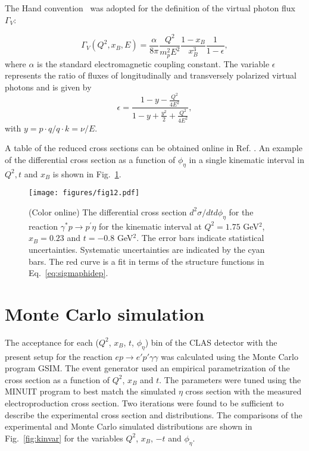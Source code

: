 \documentclass[prc,aps,floatfix,showpacs,showkeys,twocolumn,superscriptaddress,letterpaper,10pt]{revtex4-1}
\begin{document}
\noindent
The Hand convention~\cite{Hand:1963bb} was adopted for the
definition of the virtual photon flux $\Gamma_V$: 

\begin{equation}
\Gamma_V (Q^2,x_B,E)= \frac{\alpha}{8\pi} \frac{Q^2}{m_p^2 E^2} 
\frac{1-x_B}{x_B^3} \frac{1}{1-\epsilon},
\label{eq:GammaV}
\end{equation}
\noindent where $\alpha$ is the standard electromagnetic coupling constant.
The variable $\epsilon$ represents the ratio of fluxes of longitudinally  and transversely polarized virtual photons and is given by
\begin{equation}
\epsilon=\frac {1-y-\frac{Q^2}{4E^2}}   {1-y+\frac{y^2}{2}+\frac{Q^2}{4E^2} }
\label{epsilon},
\end{equation}
with $y=p \cdot q/q \cdot k=\nu/E$.

A table of  the  reduced cross sections  can be obtained online in Ref. \cite{Supplemental_eta-PRC}.
An example of the differential cross section as a function of 
$\phi_\eta$ in a single kinematic interval in $Q^2, t$ and $x_B$ is shown in Fig.~\ref{fig:cross-section}.

\begin{figure}
\texttt{[image: figures/fig12.pdf]}
\caption{
(Color online)
The differential cross section $d^2\sigma/dtd\phi_\eta$ for the reaction $\gamma^*p\to p^\prime\eta$ for the kinematic interval at 
$Q^2=1.75$ GeV$^2$, $x_B=0.23$ and $t=-0.8$ GeV$^2$. 
The error bars indicate statistical uncertainties. 
Systematic uncertainties are indicated by the cyan bars.
The red curve is a fit 
in terms of the structure functions in Eq.~\ref{eq:sigmaphidep}. 
} 
\label{fig:cross-section} 
\end{figure}

\section{Monte Carlo simulation}
\label{montecarlo}
The acceptance for each ($Q^2$, $x_B$, $t$, $\phi_\eta$) bin of the CLAS detector with the present setup for the reaction $ep\rightarrow e'p'\gamma\gamma$ was calculated using the Monte Carlo program GSIM. The event generator used an empirical parametrization of the cross section as a function  of $Q^2$, $x_B$ and $t$. The parameters were tuned using the MINUIT program to best match the  simulated $\eta$ cross section with the measured  electroproduction cross section. 
Two iterations were found to be sufficient to describe the experimental cross section and distributions.  The comparisons of the experimental and Monte Carlo simulated distributions are shown in Fig.~\ref{fig:kinvar} for the variables $Q^2$, $x_B$, $-t$ and $\phi_\eta$.
\end{document}

